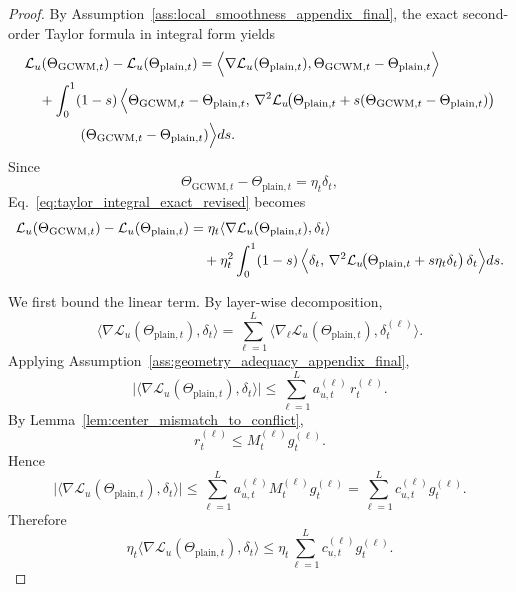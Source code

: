 \documentclass[10pt,a4paper]{amsart}
\begin{document}
\begin{proof}
By Assumption~\ref{ass:local_smoothness_appendix_final}, the exact second-order Taylor formula in integral form yields
\begin{align}
&\mathcal L_u(\Theta_{\mathrm{GCWM},t})
-
\mathcal L_u(\Theta_{\mathrm{plain},t})
=
\Bigl\langle
\nabla \mathcal L_u(\Theta_{\mathrm{plain},t}),
\Theta_{\mathrm{GCWM},t}-\Theta_{\mathrm{plain},t}
\Bigr\rangle
\nonumber\\
&\quad
+
\int_0^1 (1-s)\,
\Bigl\langle
\Theta_{\mathrm{GCWM},t}-\Theta_{\mathrm{plain},t},\,
\nabla^2\mathcal L_u\!\bigl(
\Theta_{\mathrm{plain},t}
+s(\Theta_{\mathrm{GCWM},t}-\Theta_{\mathrm{plain},t})
\bigr)
\nonumber\\
&\qquad\qquad
(\Theta_{\mathrm{GCWM},t}-\Theta_{\mathrm{plain},t})
\Bigr\rangle ds.
\label{eq:taylor_integral_exact_revised}
\end{align}
Since
\[
\Theta_{\mathrm{GCWM},t}-\Theta_{\mathrm{plain},t}
=
\eta_t \delta_t,
\]
Eq.~\eqref{eq:taylor_integral_exact_revised} becomes
\begin{align}
\mathcal L_u(\Theta_{\mathrm{GCWM},t})
-
\mathcal L_u(\Theta_{\mathrm{plain},t})
&=
\eta_t
\langle
\nabla \mathcal L_u(\Theta_{\mathrm{plain},t}),
\delta_t
\rangle
\nonumber\\
&\quad
+
\eta_t^2
\int_0^1 (1-s)\,
\Bigl\langle
\delta_t,\,
\nabla^2\mathcal L_u\!\bigl(\Theta_{\mathrm{plain},t}+s\eta_t\delta_t\bigr)\,
\delta_t
\Bigr\rangle ds.
\label{eq:taylor_substituted_revised}
\end{align}

We first bound the linear term. By layer-wise decomposition,
\begin{equation}
\langle
\nabla \mathcal L_u(\Theta_{\mathrm{plain},t}),
\delta_t
\rangle
=
\sum_{\ell=1}^L
\langle
\nabla_{\ell}\mathcal L_u(\Theta_{\mathrm{plain},t}),
\delta_t^{(\ell)}
\rangle.
\label{eq:linear_layer_decomp_revised}
\end{equation}
Applying Assumption~\ref{ass:geometry_adequacy_appendix_final},
\begin{equation}
\bigl|
\langle
\nabla \mathcal L_u(\Theta_{\mathrm{plain},t}),
\delta_t
\rangle
\bigr|
\le
\sum_{\ell=1}^L
a_{u,t}^{(\ell)}\, r_t^{(\ell)}.
\label{eq:linear_bound_via_r_revised}
\end{equation}
By Lemma~\ref{lem:center_mismatch_to_conflict},
\[
r_t^{(\ell)}
\le
M_t^{(\ell)} g_t^{(\ell)}.
\]
Hence
\begin{equation}
\bigl|
\langle
\nabla \mathcal L_u(\Theta_{\mathrm{plain},t}),
\delta_t
\rangle
\bigr|
\le
\sum_{\ell=1}^L
a_{u,t}^{(\ell)}M_t^{(\ell)} g_t^{(\ell)}
=
\sum_{\ell=1}^L
c_{u,t}^{(\ell)} g_t^{(\ell)}.
\label{eq:linear_bound_via_g_revised}
\end{equation}
Therefore
\begin{equation}
\eta_t
\langle
\nabla \mathcal L_u(\Theta_{\mathrm{plain},t}),
\delta_t
\rangle
\le
\eta_t
\sum_{\ell=1}^L
c_{u,t}^{(\ell)} g_t^{(\ell)}.
\label{eq:linear_term_final_revised}
\end{equation}


\end{proof}
\end{document}
